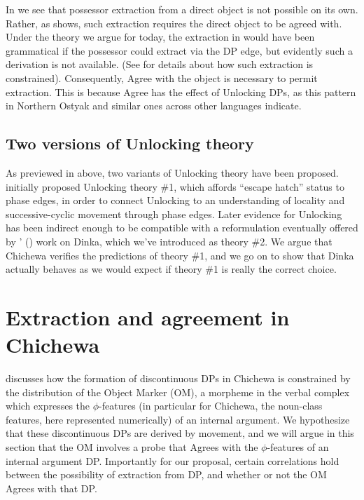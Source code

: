 \documentclass[output=paper,colorlinks,citecolor=brown]{langscibook}
\begin{document}
In  we see that possessor extraction from a direct object is not possible on its own. Rather, as  shows, such extraction requires the direct object to be agreed with. Under the theory we argue for today, the extraction in  would have been grammatical if the possessor could extract via the DP edge, but evidently such a derivation is not available. (See \citealt{Branan2018} for details about how such extraction is constrained). Consequently, Agree with the object is necessary to permit extraction. This is because Agree has the effect of Unlocking DPs, as this pattern in Northern Ostyak and similar ones across other languages indicate.

\subsection{Two versions of Unlocking theory}\label{sec:branan:2.3}

As previewed in  above, two variants of Unlocking theory have been proposed. \citeauthor{RackowskiRichards2005} initially proposed Unlocking theory \#1, which affords “escape hatch” status to phase edges, in order to connect Unlocking to an understanding of locality and successive-cyclic movement through phase edges. Later evidence for Unlocking has been indirect enough to be compatible with a reformulation eventually offered by \citeauthor{VanUrkRichards2015}' (\citeyear{VanUrkRichards2015}) work on Dinka, which we've introduced as theory \#2. We argue that Chichewa verifies the predictions of theory $\#$1, and we go on to show that Dinka actually behaves as we would expect if theory \#1 is really the correct choice.

\section{Extraction and agreement in Chichewa}\label{sec:branan:3}

\citet{Mchombo2004, Mchombo2006} discusses how the formation of discontinuous DPs in Chichewa is constrained by the distribution of the Object Marker (OM), a morpheme in the verbal complex which expresses the $\phi$-features (in particular for Chichewa, the noun-class features, here represented numerically) of an internal argument. We hypothesize that these discontinuous DPs are derived by movement, and we will argue in this section that the OM involves a probe that Agrees with the $\phi$-features of an internal argument DP. Importantly for our proposal, certain correlations hold between the possibility of extraction from DP, and whether or not the OM Agrees with that DP.
\end{document}
